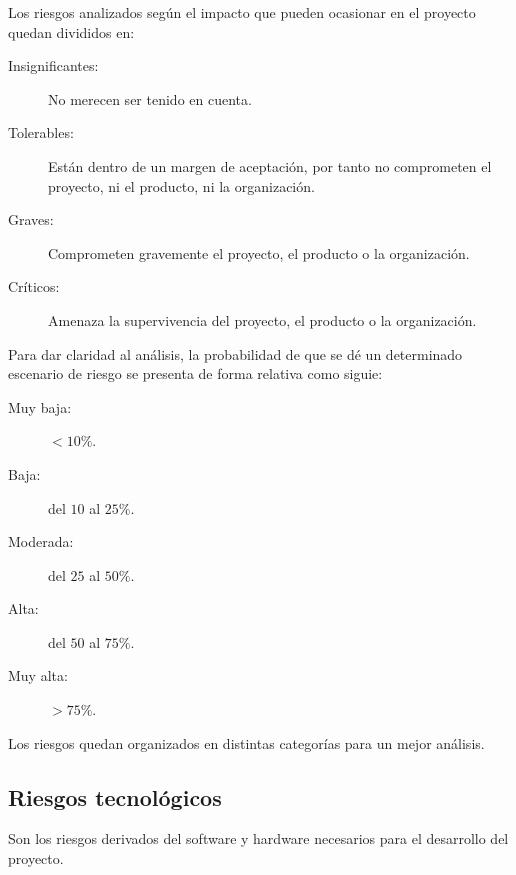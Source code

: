 Los riesgos analizados según el impacto que pueden ocasionar en el proyecto quedan divididos en:
\begin {description}
\item[Insignificantes:] No merecen ser tenido en cuenta.
\item[Tolerables:] Están dentro de un margen de aceptación, por tanto no comprometen el proyecto, ni el producto, ni la organización.
\item[Graves:] Comprometen gravemente el proyecto, el producto o la organización.
\item[Críticos:] Amenaza la supervivencia del proyecto, el producto o la organización.
\end{description}

Para dar claridad al análisis, la probabilidad de que se dé un determinado escenario de riesgo se presenta de forma relativa como siguie:
\begin{description}
\item[Muy baja:] $<10\%$.
\item[Baja:] del $10$ al $25\%$.
\item[Moderada:] del $25$ al $50\%$.
\item[Alta:] del $50$ al $75\%$.
\item[Muy alta:] $>75\%$.
\end{description}

Los riesgos quedan organizados en distintas categorías para un mejor análisis.


\subsection{Riesgos tecnológicos}
Son los riesgos derivados del software y hardware necesarios para el desarrollo del 
proyecto.

